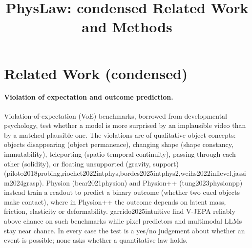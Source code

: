\documentclass[10pt]{article}
\title{PhysLaw: condensed Related Work and Methods}
\date{}
\providecommand{\citet}[1]{\textsf{#1}}
\providecommand{\citep}[1]{(\textsf{#1})}
\begin{document}
\sloppy
\maketitle

\section{Related Work (condensed)}

\paragraph{Violation of expectation and outcome prediction.}
Violation-of-expectation (VoE) benchmarks, borrowed from developmental psychology, test whether a model is more
surprised by an implausible video than by a matched plausible one. The violations are of qualitative object concepts:
objects disappearing (object permanence), changing shape (shape constancy, immutability), teleporting
(spatio-temporal continuity), passing through each other (solidity), or floating unsupported (gravity, support)
\citep{piloto2018probing,riochet2022intphys,bordes2025intphys2,weihs2022inflevel,jassim2024grasp}.
Physion \citep{bear2021physion} and Physion++ \citep{tung2023physionpp} instead train a readout to predict a binary
outcome (whether two cued objects make contact), where in Physion++ the outcome depends on latent mass, friction,
elasticity or deformability. \citet{garrido2025intuitive} find V-JEPA reliably above chance on such benchmarks while
pixel predictors and multimodal LLMs stay near chance. In every case the test is a yes/no judgement about whether an
event is possible; none asks whether a quantitative law holds.
\end{document}
